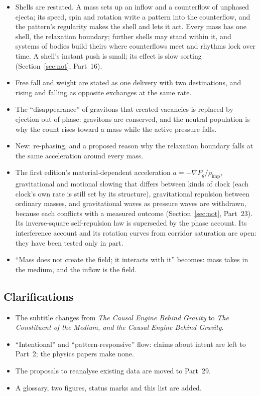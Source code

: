 \documentclass[11pt,a4paper]{article}
\begin{document}
\begin{itemize}
\item Shells are restated. A mass sets up an inflow and a counterflow of unphased ejecta; its speed, spin and rotation write a pattern into the counterflow, and the pattern's regularity makes the shell and lets it act. Every mass has one shell, the relaxation boundary; further shells may stand within it, and systems of bodies build theirs where counterflows meet and rhythms lock over time. A shell's instant push is small; its effect is slow sorting (Section~\ref{sec:not}, Part~16).
\item Free fall and weight are stated as one delivery with two destinations, and rising and falling as opposite exchanges at the same rate.
\item The ``disappearance'' of gravitons that created vacancies is replaced by ejection out of phase: gravitons are conserved, and the neutral population is why the count rises toward a mass while the active pressure falls.
\item New: re-phasing, and a proposed reason why the relaxation boundary falls at the same acceleration around every mass.
\item The first edition's material-dependent acceleration $a = -\nabla P_g/\rho_{\text{imp}}$, gravitational and motional slowing that differs between kinds of clock (each clock's own rate is still set by its structure), gravitational repulsion between ordinary masses, and gravitational waves as pressure waves are withdrawn, because each conflicts with a measured outcome (Section~\ref{sec:not}, Part~23). Its inverse-square self-repulsion law is superseded by the phase account. Its interference account and its rotation curves from corridor saturation are open: they have been tested only in part.
\item ``Mass does not create the field; it interacts with it'' becomes: mass takes in the medium, and the inflow is the field.
\end{itemize}

\subsection*{Clarifications}
\begin{itemize}
\item The subtitle changes from \emph{The Causal Engine Behind Gravity} to \emph{The Constituent of the Medium, and the Causal Engine Behind Gravity}.
\item ``Intentional'' and ``pattern-responsive'' flow: claims about intent are left to Part~2; the physics papers make none.
\item The proposals to reanalyse existing data are moved to Part~29.
\item A glossary, two figures, status marks and this list are added.
\end{itemize}

\newpage


\end{document}
